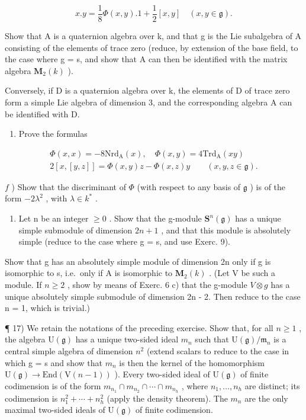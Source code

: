 \[
x. y = \frac {1}{8} \Phi (x, y). 1 + \frac {1}{2} [ x, y ] \quad (x, y \in \mathfrak {g}).
\]

Show that A is a quaternion algebra over k, and that g is the Lie subalgebra of A consisting of the elements of trace zero (reduce, by extension of the base field, to the case where g = s, and show that A can then be identified with the matrix algebra \(\mathbf{M}_{2}(k)\) ).

Conversely, if D is a quaternion algebra over k, the elements of D of trace zero form a simple Lie algebra of dimension 3, and the corresponding algebra A can be identified with D.

\begin{enumerate}
\def\labelenumi{\alph{enumi})}
\setcounter{enumi}{4}
\tightlist
\item
  Prove the formulas
\end{enumerate}

\[
\begin{array}{c} \Phi (x, x) = - 8 \mathrm{Nrd} _ {\mathrm{A}} (x), \quad \Phi (x, y) = 4 \mathrm{Trd} _ {\mathrm{A}} (x y) \\ 2 [ x, [ y, z ] ] = \Phi (x, y) z - \Phi (x, z) y \qquad (x, y, z \in \mathfrak {g}). \end{array}
\]

\(f\) ) Show that the discriminant of \(\varPhi\) (with respect to any basis of \(\mathfrak{g}\) ) is of the form \(-2\lambda^2\) , with \(\lambda \in k^{*}\) .

\begin{enumerate}
\def\labelenumi{\alph{enumi})}
\setcounter{enumi}{6}
\tightlist
\item
  Let n be an integer \(\geq 0\) . Show that the g-module \(\mathbf{S}^{n}(\mathfrak{g})\) has a unique simple submodule of dimension \(2n + 1\) , and that this module is absolutely simple (reduce to the case where g = s, and use Exerc. 9).
\end{enumerate}

Show that g has an absolutely simple module of dimension 2n only if g is isomorphic to s, i.e.~only if A is isomorphic to \(\mathbf{M}_{2}(k)\) . (Let V be such a module. If \(n \geq 2\) , show by means of Exerc. 6 c) that the g-module \(V \otimes g\) has a unique absolutely simple submodule of dimension 2n - 2. Then reduce to the case n = 1, which is trivial.)

¶ 17) We retain the notations of the preceding exercise. Show that, for all \(n \geq 1\) , the algebra \(\mathrm{U}(\mathfrak{g})\) has a unique two-sided ideal \(m_{n}\) such that \(\mathrm{U}(\mathfrak{g}) / \mathfrak{m}_{n}\) is a central simple algebra of dimension \(n^{2}\) (extend scalars to reduce to the case in which g = s and show that \(m_{n}\) is then the kernel of the homomorphism \(\mathrm{U}(\mathfrak{g}) \to \mathrm{End}(\mathrm{V}(n-1))\) ). Every two-sided ideal of \(\mathrm{U}(\mathfrak{g})\) of finite codimension is of the form \(m_{n_{1}} \cap m_{n_{2}} \cap \cdots \cap m_{n_{h}}\) , where \(n_{1}, \ldots, n_{h}\) are distinct; its codimension is \(n_{1}^{2} + \cdots + n_{h}^{2}\) (apply the density theorem). The \(m_{n}\) are the only maximal two-sided ideals of \(\mathrm{U}(\mathfrak{g})\) of finite codimension.

